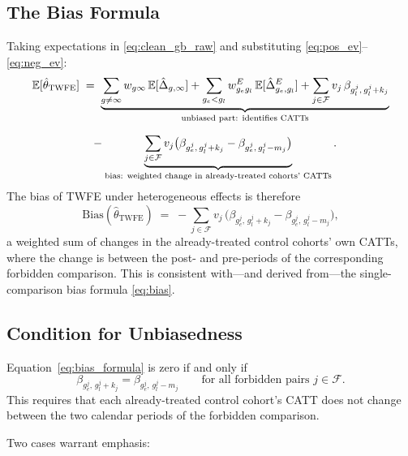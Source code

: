\documentclass[12pt,letterpaper]{article}
\theoremstyle{remark}
\theoremstyle{definition}
\newcommand{\E}{\mathbb{E}}
\newcommand{\TWFE}{\hat{\theta}_{\mathrm{TWFE}}}
\newcommand{\hDelta}{\hat{\Delta}}
\begin{document}
\subsection{The Bias Formula}

Taking expectations in \eqref{eq:clean_gb_raw} and substituting
\eqref{eq:pos_ev}--\eqref{eq:neg_ev}:
\begin{align}
  \E[\TWFE]
  &\;=\;
  \underbrace{%
    \sum_{g\neq\infty}w_{g\infty}\,\E[\hDelta_{g,\infty}]
    +\sum_{g_e<g_l}w_{g_e g_l}^{E}\,\E[\hDelta_{g_e,g_l}^{E}]
    +\sum_{j\in\mathcal{F}}v_j\,\beta_{g_l^j,\,g_l^j+k_j}
  }_{\text{unbiased part: identifies CATTs}}
  \notag\\[6pt]
  &\quad
  -\underbrace{%
    \sum_{j\in\mathcal{F}}v_j
    \bigl(\beta_{g_e^j,\,g_l^j+k_j} - \beta_{g_e^j,\,g_l^j-m_j}\bigr)
  }_{\text{bias: weighted change in already-treated cohorts' CATTs}}.
  \label{eq:ev_decomp}
\end{align}
The bias of TWFE under heterogeneous effects is therefore
\begin{equation}
  \mathrm{Bias}(\TWFE)
  \;=\;
  -\sum_{j\in\mathcal{F}}
    v_j\,\bigl(\beta_{g_e^j,\,g_l^j+k_j} - \beta_{g_e^j,\,g_l^j-m_j}\bigr),
  \label{eq:bias_formula}
\end{equation}
a weighted sum of changes in the already-treated control cohorts' own CATTs,
where the change is between the post- and pre-periods of the corresponding
forbidden comparison. This is consistent with---and derived from---the single-
comparison bias formula \eqref{eq:bias}.

\subsection{Condition for Unbiasedness}

Equation~\eqref{eq:bias_formula} is zero if and only if
\begin{equation}
  \beta_{g_e^j,\,g_l^j+k_j} = \beta_{g_e^j,\,g_l^j-m_j}
  \qquad\text{for all forbidden pairs }j\in\mathcal{F}.
  \label{eq:unbias_cond}
\end{equation}
This requires that each already-treated control cohort's CATT does not change
between the two calendar periods of the forbidden comparison.

Two cases warrant emphasis:
\end{document}
